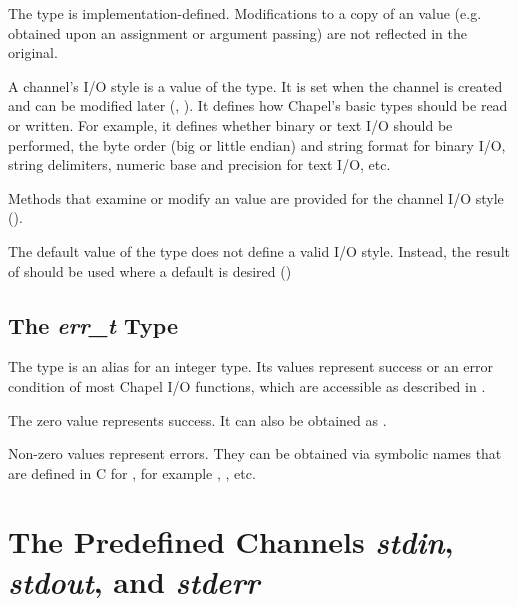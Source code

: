 The  type is implementation-defined.
Modifications to a copy of an  value (e.g.
obtained upon an assignment or argument passing)
are not reflected in the original.

A channel's I/O style is a value of the  type.
It is set when the channel is created and can be modified later
(, ).
It defines how Chapel's basic types should be read or written.
For example, it defines whether binary or text I/O
should be performed, the byte order (big or little endian)
and string format for binary I/O, string delimiters,
numeric base and precision for text I/O, etc.

Methods that examine or modify an  value
are provided for the channel I/O style
().

The default value of the  type does not define
a valid I/O style.
Instead, the result of  should be used where
a default is desired ()



\subsection{The {\em err\_t} Type}
\label{IO_err_type}

The  type is an alias for an integer type.
Its values represent success or an error condition of most Chapel I/O
functions, which are accessible as described in .

The zero value represents success. It can also be obtained as .

Non-zero values represent errors. They can be obtained via symbolic
names that are defined in C for , for example
, , etc.



\section{The Predefined Channels {\em stdin}, {\em stdout}, and {\em stderr}}
\label{IO_std_channels}

